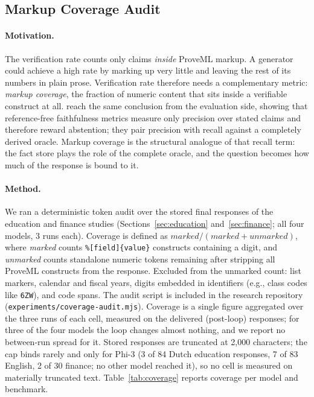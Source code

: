 \documentclass[11pt,a4paper]{article}
\begin{document}
\subsection{Markup Coverage Audit}
\label{sec:coverage}

\paragraph{Motivation.} The verification rate counts only claims \textit{inside} ProveML markup. A generator could achieve a high rate by marking up very little and leaving the rest of its numbers in plain prose. Verification rate therefore needs a complementary metric: \textit{markup coverage}, the fraction of numeric content that sits inside a verifiable construct at all. \citet{santillana2026} reach the same conclusion from the evaluation side, showing that reference-free faithfulness metrics measure only precision over stated claims and therefore reward abstention; they pair precision with recall against a completely derived oracle. Markup coverage is the structural analogue of that recall term: the fact store plays the role of the complete oracle, and the question becomes how much of the response is bound to it.

\paragraph{Method.} We ran a deterministic token audit over the stored final responses of the education and finance studies (Sections~\ref{sec:education} and~\ref{sec:finance}; all four models, 3 runs each). Coverage is defined as $\textit{marked} / (\textit{marked} + \textit{unmarked})$, where \textit{marked} counts \texttt{\%[field]\{value\}} constructs containing a digit, and \textit{unmarked} counts standalone numeric tokens remaining after stripping all ProveML constructs from the response. Excluded from the unmarked count: list markers, calendar and fiscal years, digits embedded in identifiers (e.g., class codes like \texttt{6ZW}), and code spans. The audit script is included in the research repository (\texttt{experiments/coverage-audit.mjs}). Coverage is a single figure aggregated over the three runs of each cell, measured on the delivered (post-loop) responses; for three of the four models the loop changes almost nothing, and we report no between-run spread for it. Stored responses are truncated at 2{,}000 characters; the cap binds rarely and only for Phi-3 (3 of 84 Dutch education responses, 7 of 83 English, 2 of 30 finance; no other model reached it), so no cell is measured on materially truncated text. Table~\ref{tab:coverage} reports coverage per model and benchmark.
\end{document}
